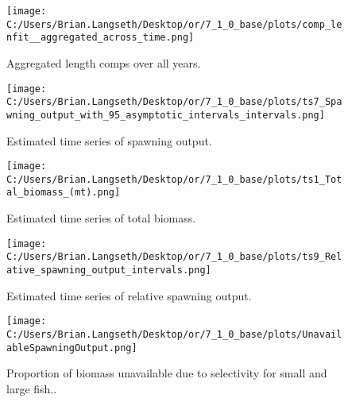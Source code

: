 \documentclass[11pt,
  english,
  a4paper,
]{article}
\begin{document}

\begin{figure}
\centering
\texttt{[image: C:/Users/Brian.Langseth/Desktop/or/7\_1\_0\_base/plots/comp\_lenfit\_\_aggregated\_across\_time.png]}
\caption{Aggregated length comps over all years.\label{fig:agg-len-fit}}
\end{figure}

\tagmcend\tagstructend


\begin{figure}
\centering
\texttt{[image: C:/Users/Brian.Langseth/Desktop/or/7\_1\_0\_base/plots/ts7\_Spawning\_output\_with\_95\_asymptotic\_intervals\_intervals.png]}
\caption{Estimated time series of spawning output.\label{fig:ssb}}
\end{figure}

\tagmcend\tagstructend


\begin{figure}
\centering
\texttt{[image: C:/Users/Brian.Langseth/Desktop/or/7\_1\_0\_base/plots/ts1\_Total\_biomass\_(mt).png]}
\caption{Estimated time series of total biomass.\label{fig:tot-bio}}
\end{figure}

\tagmcend\tagstructend


\begin{figure}
\centering
\texttt{[image: C:/Users/Brian.Langseth/Desktop/or/7\_1\_0\_base/plots/ts9\_Relative\_spawning\_output\_intervals.png]}
\caption{Estimated time series of relative spawning output.\label{fig:depl}}
\end{figure}

\tagmcend\tagstructend


\begin{figure}
\centering
\texttt{[image: C:/Users/Brian.Langseth/Desktop/or/7\_1\_0\_base/plots/UnavailableSpawningOutput.png]}
\caption{Proportion of biomass unavailable due to selectivity for small and large fish..\label{fig:unavail-bio}}
\end{figure}
\end{document}
